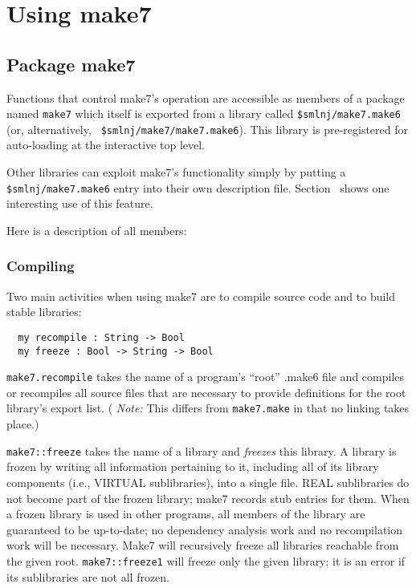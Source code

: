 
\section{Using make7}

\subsection{Package make7}
\label{sec:api}

Functions that control make7's operation are accessible as members of a
package named {\tt make7} which itself is exported from a library
called {\tt \$smlnj/make7.make6} (or, alternatively, {\tt
\$smlnj/make7/make7.make6}).  This library is pre-registered for auto-loading
at the interactive top level.

Other libraries can exploit make7's functionality simply by putting a
{\tt \$smlnj/make7.make6} entry into their own description file.
Section~ shows one interesting use of this feature.

Here is a description of all members:

\subsubsection{Compiling}
\label{sec:api:compiling}

Two main activities when using make7 are to compile source code and to
build stable libraries:

\begin{verbatim}
  my recompile : String -> Bool
  my freeze : Bool -> String -> Bool
\end{verbatim}

{\tt make7.recompile} takes the name of a program's ``root'' .make6
file and compiles or recompiles all source files that are necessary
to provide definitions for the root library's export list.  ({\em
Note:} This differs from {\tt make7.make} in that no linking takes
place.)

{\tt make7::freeze} takes the name of a library
and {\em freezes} this library.  A library is frozen by writing
all information pertaining to it, including all of its library
components (i.e., VIRTUAL sublibraries), into a single file.  REAL sublibraries do not
become part of the frozen library; make7 records stub entries for them.
When a frozen library is used in other programs, all members of
the library are guaranteed to be up-to-date; no dependency analysis
work and no recompilation work will be necessary.
Make7 will recursively freeze all libraries reachable from the given root.
{\tt make7::freeze1} will freeze only the given library;  it is an
error if its sublibraries are not all frozen.


